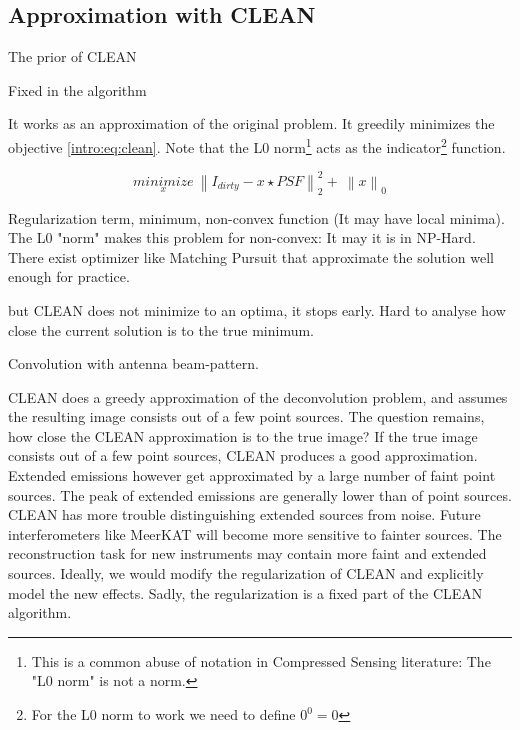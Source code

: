 \subsection{Approximation with CLEAN}
The prior of CLEAN

Fixed in the algorithm

It works as an approximation of the original problem. It greedily minimizes the objective \eqref{intro:eq:clean}. 
Note that the L0 norm\footnote{This is a common abuse of notation in Compressed Sensing literature: The "L0 norm" is not a norm.} acts as the indicator\footnote{For the L0 norm to work we need to define $0^0 = 0$} function.

\begin{equation}\label{intro:eq:clean}
\underset{x}{minimize} \: \left \| I_{dirty} - x \star PSF \right \|_2^2 + \: \left \| x \right \|_0
\end{equation}

Regularization term, minimum, non-convex function (It may have local minima). 
The L0 "norm" makes this problem for non-convex: It may  it is in NP-Hard. There exist optimizer like Matching Pursuit that approximate the solution well enough for practice.

but CLEAN does not minimize to an optima, it stops early. Hard to analyse how close the current solution is to the true minimum.

Convolution with antenna beam-pattern.

CLEAN does a greedy approximation of the deconvolution problem, and assumes the resulting image consists out of a few point sources. The question remains, how close the CLEAN approximation is to the true image? If the true image consists out of a few point sources, CLEAN produces a good approximation. Extended emissions however get approximated by a large number of faint point sources. The peak of extended emissions are generally lower than of point sources. CLEAN has more trouble distinguishing extended sources from noise. Future interferometers like MeerKAT will become more sensitive to fainter sources. The reconstruction task for new instruments may contain more faint and extended sources. Ideally, we would modify the regularization of CLEAN and explicitly model the new effects. Sadly, the regularization is a fixed part of the CLEAN algorithm.


